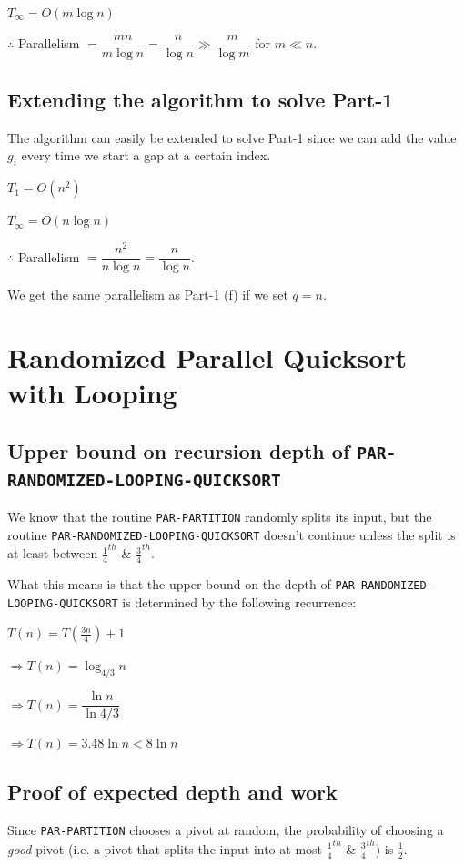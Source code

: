 \documentclass{article}
\begin{document}
$T_{\infty} = O(m\log{n})$

$\therefore$ Parallelism $= \dfrac{mn}{m\log{n}} = \dfrac{n}{\log{n}} \gg \dfrac{m}{\log{m}}$ for $m \ll n$.

\subsection{Extending the algorithm to solve Part-1}

The algorithm can easily be extended to solve Part-1 since we can add
the value $g_i$ every time we start a gap at a certain index.

$T_1 = O(n^2)$

$T_{\infty} = O(n\log{n})$

$\therefore$ Parallelism $= \dfrac{n^2}{n\log{n}} = \dfrac{n}{\log{n}}$.

We get the same parallelism as Part-1 (f) if we set $q = n$.

\clearpage

\section{Randomized Parallel Quicksort with Looping}

\subsection{Upper bound on recursion depth of \texttt{PAR-RANDOMIZED-LOOPING-QUICKSORT}}

We know that the routine \texttt{PAR-PARTITION} randomly splits its
input, but the routine \texttt{PAR-RANDOMIZED-LOOPING-QUICKSORT}
doesn't continue unless the split is at least between
$\frac{1}{4}^{th}$ \& $\frac{3}{4}^{th}$.

What this means is that the upper bound on the depth of
\texttt{PAR-RANDOMIZED-LOOPING-QUICKSORT} is determined by the
following recurrence:

$T(n) = T(\frac{3n}{4}) + 1$

$\Rightarrow T(n) = \log_{4/3}{n}$

$\Rightarrow T(n) = \dfrac{\ln{n}}{\ln{4/3}}$

$\Rightarrow T(n) = 3.48\ln{n} < 8\ln{n}$

\subsection{Proof of expected depth and work}

Since \texttt{PAR-PARTITION} chooses a pivot at random, the
probability of choosing a \textit{good} pivot (i.e. a pivot that
splits the input into at most $\frac{1}{4}^{th}$ \&
$\frac{3}{4}^{th}$) is $\frac{1}{2}$.
\end{document}
